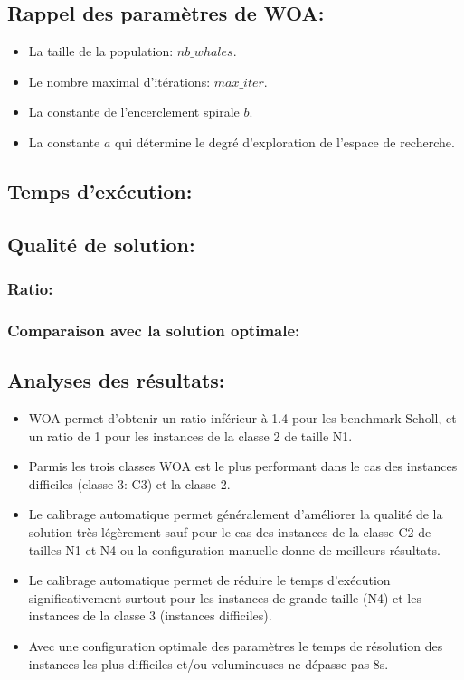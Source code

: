 \documentclass[12pt]{article}
\begin{document}
\subsection{Rappel des paramètres de WOA: }
\begin{itemize}
    \item La taille de la population: \(nb\_whales\).
    \item Le nombre maximal d’itérations: \(max\_iter\).
    \item La constante de l’encerclement spirale \(b\).
    \item La constante \(a\) qui détermine le degré d’exploration de l’espace de recherche.
\end{itemize}
\subsection{Temps d'exécution: }
\subsection{Qualité de solution: }
\subsubsection{Ratio: }
\subsubsection{Comparaison avec la solution optimale: }
\subsection{Analyses des résultats: }
\begin{itemize}
    \item WOA permet d'obtenir un ratio inférieur à 1.4 pour les benchmark Scholl, et un ratio de 1 pour les instances de la classe 2 de taille N1.
    \item Parmis les trois classes WOA est le plus performant dans le cas des instances difficiles (classe 3: C3) et la classe 2.
    \item Le calibrage automatique permet généralement d’améliorer la qualité de la solution très légèrement sauf pour le cas des instances de la classe C2 de tailles N1 et N4 ou la configuration manuelle donne de meilleurs résultats.
    \item Le calibrage automatique permet de réduire le temps d’exécution significativement surtout pour les instances de grande taille (N4) et les instances de la classe 3 (instances difficiles).
    \item Avec une configuration optimale des paramètres le temps de résolution des instances les plus difficiles et/ou volumineuses ne dépasse pas 8s.
\end{itemize}
\end{document}
